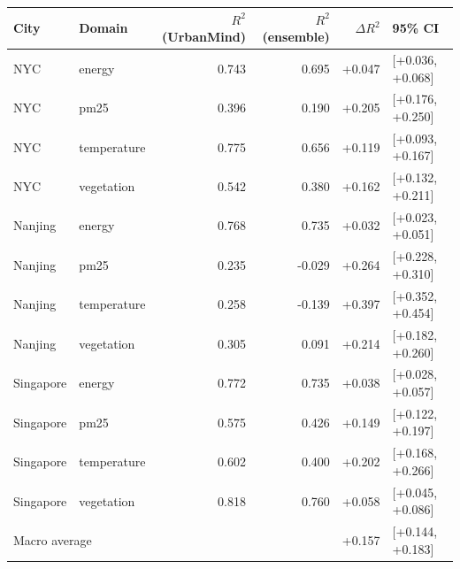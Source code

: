 \begin{tabular}{llrrrl}
\toprule
City & Domain & $R^2$ (UrbanMind) & $R^2$ (ensemble) & $\Delta R^2$ & 95\% CI \\
\midrule
NYC & energy & 0.743 & 0.695 & +0.047 & [+0.036, +0.068] \\
NYC & pm25 & 0.396 & 0.190 & +0.205 & [+0.176, +0.250] \\
NYC & temperature & 0.775 & 0.656 & +0.119 & [+0.093, +0.167] \\
NYC & vegetation & 0.542 & 0.380 & +0.162 & [+0.132, +0.211] \\
Nanjing & energy & 0.768 & 0.735 & +0.032 & [+0.023, +0.051] \\
Nanjing & pm25 & 0.235 & -0.029 & +0.264 & [+0.228, +0.310] \\
Nanjing & temperature & 0.258 & -0.139 & +0.397 & [+0.352, +0.454] \\
Nanjing & vegetation & 0.305 & 0.091 & +0.214 & [+0.182, +0.260] \\
Singapore & energy & 0.772 & 0.735 & +0.038 & [+0.028, +0.057] \\
Singapore & pm25 & 0.575 & 0.426 & +0.149 & [+0.122, +0.197] \\
Singapore & temperature & 0.602 & 0.400 & +0.202 & [+0.168, +0.266] \\
Singapore & vegetation & 0.818 & 0.760 & +0.058 & [+0.045, +0.086] \\
\midrule
\multicolumn{4}{l}{Macro average} & +0.157 & [+0.144, +0.183] \\
\bottomrule
\end{tabular}